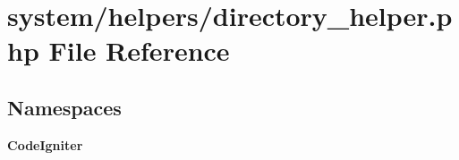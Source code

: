 \section{system/helpers/directory\-\_\-helper.php File Reference}
\label{directory__helper_8php}
\subsection*{Namespaces}
\begin{DoxyCompactItemize}
\item 
{\bf Code\-Igniter}
\end{DoxyCompactItemize}
